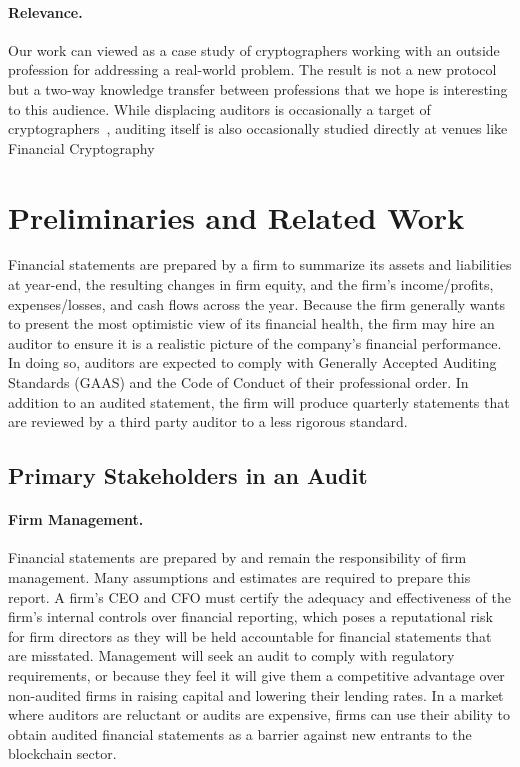 \paragraph{\textbf{Relevance.}} Our work can viewed as a case study of cryptographers working with an outside profession for addressing a real-world problem. The result is not a new protocol but a two-way knowledge transfer between professions that we hope is interesting to this audience. While displacing auditors is occasionally a target of cryptographers~\cite{narula_zkledger, dagher_provisions}, auditing itself is also occasionally studied directly at venues like Financial Cryptography



\section{Preliminaries and Related Work}
Financial statements are prepared by a firm to summarize its assets and liabilities at year-end, the resulting changes in firm equity, and the firm’s income/profits, expenses/losses, and cash flows across the year. Because the firm generally wants to present the most optimistic view of its financial health, the firm may hire an auditor to ensure it is a realistic picture of the company's financial performance. In doing so, auditors are expected to comply with Generally Accepted Auditing Standards (GAAS) and the Code of Conduct of their professional order. In addition to an audited statement, the firm will produce quarterly statements that are reviewed by a third party auditor to a less rigorous standard.




\subsection{Primary Stakeholders in an Audit}

\paragraph{Firm Management.} Financial statements are prepared by and remain the responsibility of firm management. Many assumptions and estimates are required to prepare this report. A firm's CEO and CFO must certify the adequacy and effectiveness of the firm's internal controls over financial reporting, which poses a reputational risk for firm directors as they will be held accountable for financial statements that are misstated. Management will seek an audit to comply with regulatory requirements, or because they feel it will give them a competitive advantage over non-audited firms in raising capital and lowering their lending rates. In a market where auditors are reluctant or audits are expensive, firms can use their ability to obtain audited financial statements as a barrier against new entrants to the blockchain sector. 

